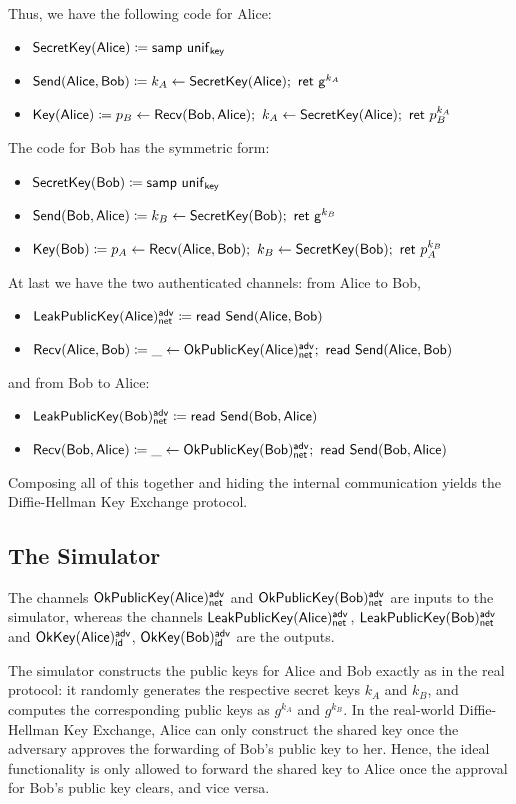 Thus, we have the following code for Alice:
\begin{itemize}
\item $\mathsf{SecretKey}(\mathsf{Alice}) \coloneqq \mathsf{samp} \ \mathsf{unif}_{\mathsf{key}}$
\item $\mathsf{Send}(\mathsf{Alice},\mathsf{Bob}) \coloneqq k_A \leftarrow \mathsf{SecretKey}(\mathsf{Alice}); \ \mathsf{ret} \ \mathsf{g}^{k_A}$
\item $\Key(\Alice) \coloneqq p_B \leftarrow \Recv(\Bob,\Alice); \ k_A \leftarrow \SecretKey(\Alice); \ \ret{p_B^{k_A}}$
\end{itemize}
The code for Bob has the symmetric form:
\begin{itemize}
\item $\mathsf{SecretKey}(\mathsf{Bob}) \coloneqq \mathsf{samp} \ \mathsf{unif}_{\mathsf{key}}$
\item $\mathsf{Send}(\mathsf{Bob},\mathsf{Alice}) \coloneqq k_B \leftarrow \mathsf{SecretKey}(\mathsf{Bob}); \ \mathsf{ret} \ \mathsf{g}^{k_B}$
\item $\Key(\Bob) \coloneqq p_A \leftarrow \Recv(\Alice,\Bob); \ k_B \leftarrow \SecretKey(\Bob); \ \ret{p_A^{k_B}}$
\end{itemize}
At last we have the two authenticated channels: from Alice to Bob,
\begin{itemize}
\item $\mathsf{LeakPublicKey}(\mathsf{Alice})^{\mathsf{adv}}_{\mathsf{net}} \coloneqq \mathsf{read} \ \mathsf{Send}(\mathsf{Alice},\mathsf{Bob})$
\item $\Recv(\Alice,\Bob) \coloneqq \_ \leftarrow \OkPublicKey(\Alice)^\adv_\net; \ \read{\Send(\Alice,\Bob)}$
\end{itemize}
and from Bob to Alice:
\begin{itemize}
\item $\mathsf{LeakPublicKey}(\mathsf{Bob})^{\mathsf{adv}}_{\mathsf{net}} \coloneqq \mathsf{read} \ \mathsf{Send}(\mathsf{Bob},\mathsf{Alice})$
\item $\Recv(\Bob,\Alice) \coloneqq \_ \leftarrow \OkPublicKey(\Bob)^\adv_\net; \ \read{\Send(\Bob,\Alice)}$
\end{itemize}
Composing all of this together and hiding the internal communication yields the Diffie-Hellman Key Exchange protocol.

\subsection{The Simulator}
The channels $\mathsf{OkPublicKey}(\mathsf{Alice})^{\mathsf{adv}}_{\mathsf{net}}$ and $\mathsf{OkPublicKey}(\mathsf{Bob})^{\mathsf{adv}}_{\mathsf{net}}$ are inputs to the simulator, whereas the channels $\mathsf{LeakPublicKey}(\mathsf{Alice})^{\mathsf{adv}}_{\mathsf{net}}$, $\mathsf{LeakPublicKey}(\mathsf{Bob})^{\mathsf{adv}}_{\mathsf{net}}$ and $\mathsf{OkKey}(\mathsf{Alice})^{\mathsf{adv}}_{\mathsf{id}}$, $ \mathsf{OkKey}(\mathsf{Bob})^{\mathsf{adv}}_{\mathsf{id}}$ are the outputs.

The simulator constructs the public keys for Alice and Bob exactly as in the real protocol: it randomly generates the respective secret keys $k_A$ and $k_B$, and computes the corresponding public keys as $g^{k_A}$ and $g^{k_B}$. In the real-world Diffie-Hellman Key Exchange, Alice can only construct the shared key once the adversary approves the forwarding of Bob's public key to her. Hence, the ideal functionality is only allowed to forward the shared key to Alice once the approval for Bob's public key clears, and vice versa.

